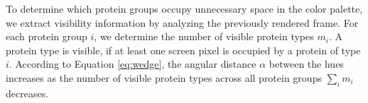 \documentclass{egpubl}
\begin{document}
	
	To determine which protein groups occupy unnecessary space in the color palette, we extract visibility information by analyzing the previously rendered frame.
	For each protein group $i$, we determine the number of visible protein types $m_i$. 
	A protein type is visible, if at least one screen pixel is occupied by a protein of type $i$. 
	According to Equation \ref{eq:wedge}, the angular distance $\alpha$ between the hues increases as the number of visible protein types across all protein groups $\sum_{i} m_i$ decreases. 
	
\end{document}
